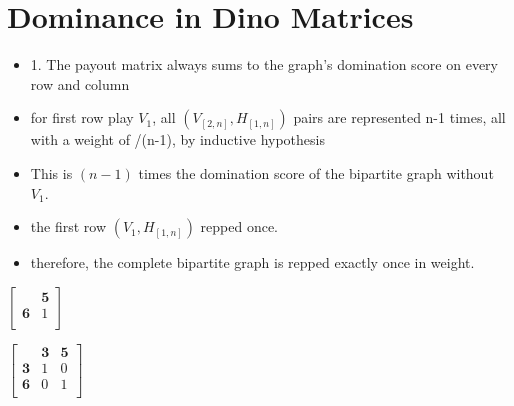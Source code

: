 \documentclass[11pt, oneside]{article} 	%
\begin{document}

\section{Dominance in Dino Matrices}

\begin{itemize}
\item 1. The payout matrix always sums to the graph's domination score on every row and column
\item for first row play $V_1$, all $(V_[2,n], H_[1,n])$ pairs are represented n-1 times, all with a weight of /(n-1), by inductive hypothesis
\item This is $(n-1)$ times the domination score of the bipartite graph without $V_1$.
\item the first row $(V_1, H_[1,n])$ repped once.
\item therefore, the complete bipartite graph is repped exactly once in weight.
\end{itemize}

$ \left[\begin{array}{cc}
                        &  \mathbf{5}\\ 
                        \mathbf{6} & 1\\
                      \end{array}\right] 
$

$ \left[\begin{array}{ccc}
                        & \mathbf{3} & \mathbf{5}\\ 
                       \mathbf{3} & 1 & 0\\
                        \mathbf{6} & 0 & 1\\
                      \end{array}\right] 
$
\end{document}
